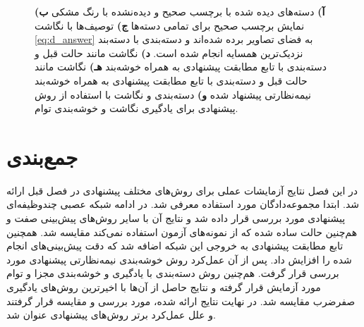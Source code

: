 \begin{figure}[t]
{  \textbf{آ)}
   دسته‌های دیده شده با برچسب صحیح و دیده‌نشده با رنگ مشکی
\textbf{ب)}
 نمایش برچسب صحیح برای تمامی دسته‌ها
  \textbf{ج)} توصیف‌ها با نگاشت \eqref{eq:d_answer}
  به فضای تصاویر برده شده‌اند و دسته‌بندی با دسته‌بند نزدیک‌ترین همسایه انجام شده است.
  \textbf{د)}
   نگاشت مانند حالت قبل و دسته‌بندی با تابع مطابقت پیشنهادی به همراه خوشه‌بند 
  \textbf{هـ)}
   نگاشت مانند حالت قبل و دسته‌بندی با تابع مطابقت پیشنهادی به همراه خوشه‌بند نیمه‌نظارتی پیشنهاد شده
  \textbf{و)}
  دسته‌بندی و نگاشت با استفاده از روش پیشنهادی برای یادگیری نگاشت و خوشه‌بندی توام.
  }
\label{fig:discussion}
\end{figure}

\section{جمع‌بندی}\label{exp:conclusion}
در این فصل نتایج آزمایشات عملی برای روش‌های مختلف پیشنهادی در فصل قبل ارائه شد. ابتدا  مجموعه‌دادگان مورد استفاده معرفی شد. در ادامه
شبکه عصبی چندوظیفه‌ای پیشنهادی مورد بررسی قرار داده شد و نتایج آن با سایر روش‌های پیش‌بینی صفت و هم‌چنین حالت ساده شده که از نمونه‌های آزمون استفاده نمی‌کند مقایسه شد. همچنین تابع مطابقت پیشنهادی به خروجی این شبکه اضافه شد که دقت پیش‌بینی‌های انجام شده را افزایش داد. پس از آن  عمل‌کرد روش خوشه‌بندی نیمه‌نظارتی پیشنهادی مورد بررسی قرار گرفت. هم‌چنین  روش دسته‌بندی  با یادگیری و خوشه‌بندی مجزا و توام مورد آزمایش قرار گرفته و نتایج حاصل از آن‌ها با اخیرترین روش‌های یادگیری صفرضرب مقایسه شد. در نهایت  نتایج ارائه شده، مورد بررسی و مقایسه قرار گرفتند و علل عمل‌کرد برتر روش‌های پیشنهادی عنوان شد.
